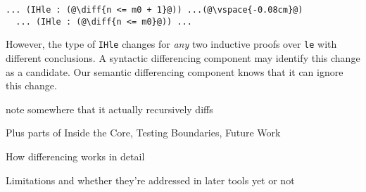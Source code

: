 \begin{lstlisting}[language=coq]
  ... (IHle : (@\diff{n <= m0 + 1}@)) ...(@\vspace{-0.08cm}@)
  ... (IHle : (@\diff{n <= m0}@)) ...
\end{lstlisting}

However, the type of \lstinline{IHle} changes for \emph{any} two inductive proofs over \lstinline{le}
with different conclusions. A syntactic differencing component 
may identify this change as a candidate.
Our semantic differencing component knows that it can ignore this change.

note somewhere that it actually recursively diffs

Plus parts of Inside the Core, Testing Boundaries, Future Work

How differencing works in detail

Limitations and whether they're addressed in later tools yet or not

